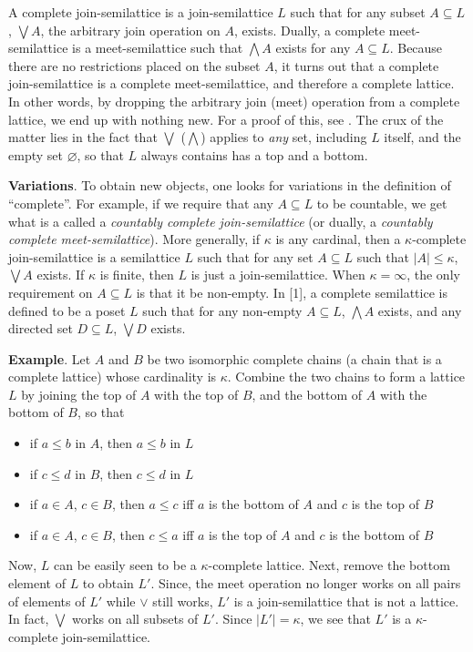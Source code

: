 \documentclass[12pt]{article}
\begin{document}
A complete join-semilattice is a join-semilattice $L$ such that for any subset $A\subseteq L$, $\bigvee A$, the arbitrary join operation on $A$, exists.  Dually, a complete meet-semilattice is a meet-semilattice such that $\bigwedge A$ exists for any $A\subseteq L$.  Because there are no restrictions placed on the subset $A$, it turns out that a 
complete join-semilattice is a complete meet-semilattice, and therefore a complete lattice.  In other words, by dropping the arbitrary join (meet) operation from a complete lattice, we end up with nothing new.  For a proof of this, see .  The crux of the matter lies in the fact that $\bigvee$ ($\bigwedge$) applies to \emph{any} set, including $L$ itself, and the empty set $\varnothing$, so that $L$ always contains has a top and a bottom.

\textbf{Variations}.  To obtain new objects, one looks for variations in the definition of ``complete''.  For example, if we require that any $A\subseteq L$ to be countable, we get what is a called a \emph{countably complete join-semilattice} (or dually, a \emph{countably complete meet-semilattice}).  More generally, if $\kappa$ is any cardinal, then a $\kappa$-complete join-semilattice is a semilattice $L$ such that for any set $A\subseteq L$ such that $|A|\le \kappa$, $\bigvee A$ exists.  If $\kappa$ is finite, then $L$ is just a join-semilattice.  When $\kappa=\infty$,  the only requirement on $A\subseteq L$ is that it be non-empty.  In [1], a complete semilattice is defined to be a poset $L$ such that for any non-empty $A\subseteq L$, $\bigwedge A$ exists, and any directed set $D\subseteq L$, $\bigvee D$ exists.

\textbf{Example}.  Let $A$ and $B$ be two isomorphic complete chains (a chain that is a complete lattice) whose cardinality is $\kappa$.  Combine the two chains to form a lattice $L$ by joining the top of $A$ with the top of $B$, and the bottom of $A$ with the bottom of $B$, so that 
\begin{itemize}
\item if $a\le b$ in $A$, then $a\le b$ in $L$
\item if $c\le d$ in $B$, then $c\le d$ in $L$
\item if $a\in A$, $c\in B$, then $a\le c$ iff $a$ is the bottom of $A$ and $c$ is the top of $B$
\item if $a\in A$, $c\in B$, then $c\le a$ iff $a$ is the top of $A$ and $c$ is the bottom of $B$
\end{itemize}
Now, $L$ can be easily seen to be a $\kappa$-complete lattice.  Next, remove the bottom element of $L$ to obtain $L'$.  Since, the meet operation no longer works on all pairs of elements of $L'$ while $\vee$ still works, $L'$ is a join-semilattice that is not a lattice.  In fact, $\bigvee$ works on all subsets of $L'$.  Since $|L'|=\kappa$, we see that $L'$ is a $\kappa$-complete join-semilattice.
\end{document}
